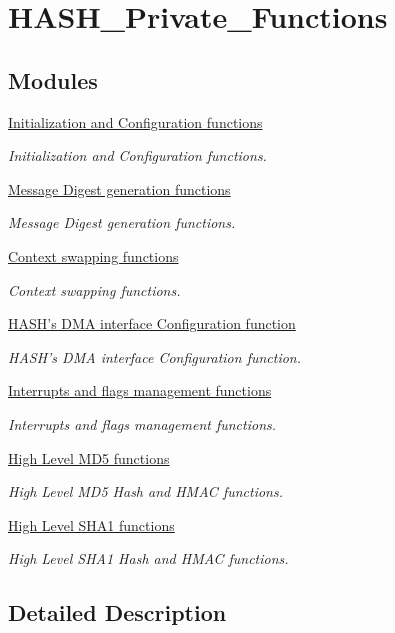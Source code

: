 \hypertarget{group___h_a_s_h___private___functions}{}\section{H\+A\+S\+H\+\_\+\+Private\+\_\+\+Functions}
\label{group___h_a_s_h___private___functions}
\subsection*{Modules}
\begin{DoxyCompactItemize}
\item 
\hyperlink{group___h_a_s_h___group1}{Initialization and Configuration functions}
\begin{DoxyCompactList}\small\item\em Initialization and Configuration functions. \end{DoxyCompactList}\item 
\hyperlink{group___h_a_s_h___group2}{Message Digest generation functions}
\begin{DoxyCompactList}\small\item\em Message Digest generation functions. \end{DoxyCompactList}\item 
\hyperlink{group___h_a_s_h___group3}{Context swapping functions}
\begin{DoxyCompactList}\small\item\em Context swapping functions. \end{DoxyCompactList}\item 
\hyperlink{group___h_a_s_h___group4}{H\+A\+S\+H's D\+M\+A interface Configuration function}
\begin{DoxyCompactList}\small\item\em H\+A\+S\+H's D\+M\+A interface Configuration function. \end{DoxyCompactList}\item 
\hyperlink{group___h_a_s_h___group5}{Interrupts and flags management functions}
\begin{DoxyCompactList}\small\item\em Interrupts and flags management functions. \end{DoxyCompactList}\item 
\hyperlink{group___h_a_s_h___group7}{High Level M\+D5 functions}
\begin{DoxyCompactList}\small\item\em High Level M\+D5 Hash and H\+M\+A\+C functions. \end{DoxyCompactList}\item 
\hyperlink{group___h_a_s_h___group6}{High Level S\+H\+A1 functions}
\begin{DoxyCompactList}\small\item\em High Level S\+H\+A1 Hash and H\+M\+A\+C functions. \end{DoxyCompactList}\end{DoxyCompactItemize}


\subsection{Detailed Description}
